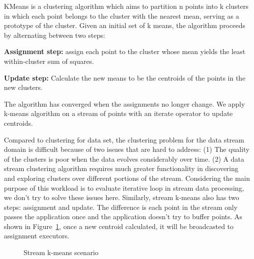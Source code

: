 KMeans is a clustering algorithm which aims to partition n points into k clusters in which each point belongs to the cluster with the nearest mean, serving as a prototype of the cluster.\cite{kmeans_wiki} Given an initial set of k means, the algorithm proceeds by alternating between two steps: \cite{mackay2003information}
\begin{description}
\item\textbf{Assignment step:} assign each point to the cluster whose mean yields the least within-cluster sum of squares.
\item \textbf{Update step:} Calculate the new means to be the centroids of the points in the new clusters.
\end{description}

The algorithm has converged when the assignments no longer change. We apply k-means algorithm on a stream of points with an iterate operator to update centroids.

Compared to clustering for data set, the clustering problem for the data stream domain is difficult because of two issues that are hard to address: (1) The quality of the clusters is poor when the data evolves considerably over time. (2) A data stream clustering algorithm requires much greater functionality in discovering and exploring clusters over different portions of the stream.\cite{aggarwal2003framework} Considering the main purpose of this workload is to evaluate iterative loop in stream data processing, we don't try to solve these issues here. Similarly, stream k-means also has two steps: assignment and update. The difference is each point in the stream only passes the application once and the application doesn't try to buffer points. As shown in Figure~\ref{fig:iterator_operator}, once a new centroid calculated, it will be broadcasted to assignment executors. 

 \begin{figure}
  \begin{center}
   \caption{Stream k-means scenario}
   \label{fig:iterator_operator}
  \end{center}
\end{figure}


